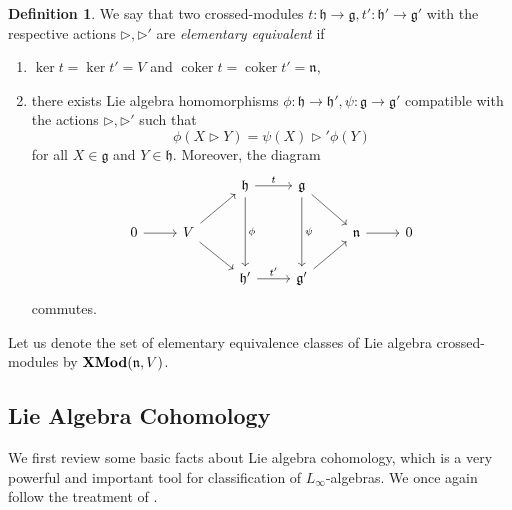 \documentclass[onecolumn]{article}
\theoremstyle{theorem}
\theoremstyle{remark}
\theoremstyle{example}
\theoremstyle{definition}
\newtheorem{definition}{Definition}[section]
\numberwithin{equation}{section}
\begin{document}
\begin{definition}\label{def:elemequiv}
We say that two crossed-modules $t:\mathfrak{h}\rightarrow\mathfrak{g},t':\mathfrak{h}'\rightarrow\mathfrak{g}'$ with the respective actions $\rhd,\rhd'$ are {\it elementary equivalent} if
\begin{enumerate}
    \item  $\operatorname{ker}t=\operatorname{ker}t'=V$ and $\operatorname{coker}t=\operatorname{coker}t' = \mathfrak{n}$,
    \item there exists Lie algebra homomorphisms $\phi:\mathfrak{h}\rightarrow\mathfrak{h}',\psi:\mathfrak{g}\rightarrow\mathfrak{g}'$ compatible with the actions $\rhd,\rhd'$ such that
    \begin{equation}
        \phi(X\rhd Y) = \psi(X)\rhd' \phi(Y)\nonumber
    \end{equation}
    for all $X\in\mathfrak{g}$ and $Y\in\mathfrak{h}$. Moreover, the diagram \begin{equation}
        \begin{tikzcd}
            &                         & \mathfrak{h} \arrow[r, "t"] \arrow[dd, "\phi"] & \mathfrak{g} \arrow[rd] \arrow[dd, "\psi"] &                        &   \\
0 \arrow[r] & V \arrow[ru] \arrow[rd] &                                                &                                            & \mathfrak{n} \arrow[r] & 0 \\
            &                         & \mathfrak{h}' \arrow[r, "t'"]                  & \mathfrak{g}' \arrow[ru]                   &                        &  
\end{tikzcd}\nonumber
    \end{equation}
    commutes.
\end{enumerate}
\end{definition}
Let us denote the set of elementary equivalence classes of Lie algebra crossed-modules {by} %
 ${\bf XMod}(\mathfrak{n},V)$.

\subsection{Lie Algebra Cohomology}\label{liealgcohomo}
We first review some basic facts about Lie algebra cohomology, which is  a very powerful and important tool for classification of $L_\infty$-algebras. We once again follow the treatment of \cite{Wag:2006}.
\end{document}
